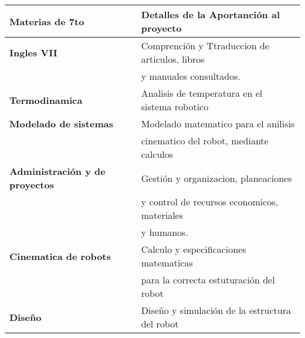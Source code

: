 \documentclass[letter,operight,12pt,spanish]{report}
\begin{document}
\begin{center}
\begin{tabular}{|l|l|}
\hline
	\textbf{Materias de 7to} & \textbf{Detalles de la Aportanci\'on al proyecto}\\
\hline
	\textbf{Ingles VII} & Comprenci\'on y Ttraduccion de articulos, libros\\
	& y manuales consultados.\\
\hline
	\textbf{Termodinamica} & Analisis de temperatura en el sistema robotico\\
\hline	
	\textbf{Modelado de sistemas} & Modelado matematico para el anilisis\\
	& cinematico del robot, mediante calculos\\
\hline
	\textbf{Administraci\'on y de proyectos} & Gesti\'on y organizacion, planeaciones\\
	& y control de recursos economicos, materiales\\
	& y humanos.\\
\hline
	\textbf{Cinematica de robots} & Calculo y especificaciones matematicas\\
	& para la correcta estuturaci\'on del robot\\
\hline
\textbf{Dise\~no} & Dise\~no y simulaci\'on de la estructura del robot\\
\hline
\end{tabular}
\end{center}
\end{document}
